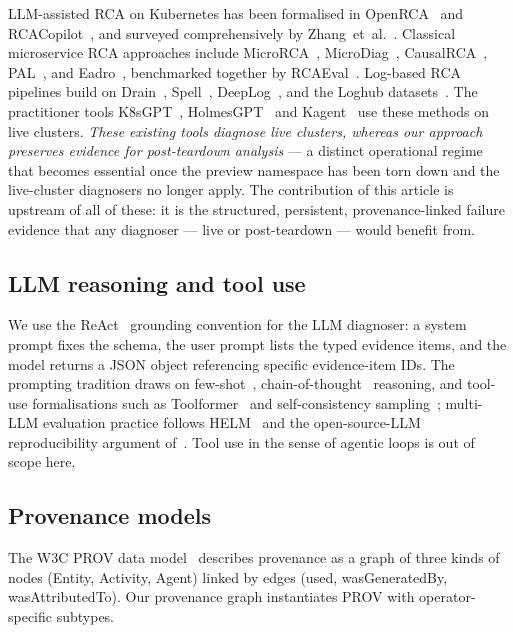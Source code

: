 \documentclass[sigconf, nonacm=true, anonymous=false, review=false]{acmart}
\begin{document}
LLM-assisted RCA on Kubernetes has been formalised in
OpenRCA~\cite{openrca_2025} and RCACopilot~\cite{rcacopilot_2024},
and surveyed comprehensively by
Zhang~et~al.~\cite{zhang_microservice_diagnosis_survey_2025}. Classical
microservice RCA approaches include
MicroRCA~\cite{microrca_2020}, MicroDiag~\cite{microdiag_2021},
CausalRCA~\cite{causalrca_2023}, PAL~\cite{pal_2011}, and
Eadro~\cite{eadro_2023}, benchmarked together by
RCAEval~\cite{rcaeval_2024}. Log-based RCA pipelines build on
Drain~\cite{drain_2017}, Spell~\cite{spell_2016},
DeepLog~\cite{deeplog_2017}, and the Loghub
datasets~\cite{loghub_2023}. The practitioner tools
K8sGPT~\cite{k8sgpt_cncf}, HolmesGPT~\cite{holmesgpt_robusta} and
Kagent~\cite{kagent} use these methods on live clusters.
\emph{These existing tools diagnose live clusters, whereas our
approach preserves evidence for post-teardown analysis} --- a
distinct operational regime that becomes essential once the
preview namespace has been torn down and the live-cluster
diagnosers no longer apply. The contribution of this article is
upstream of all of these: it is the structured, persistent,
provenance-linked failure evidence that any diagnoser --- live or
post-teardown --- would benefit from.

\subsection{LLM reasoning and tool use}
\label{sec:bg-llm}

We use the ReAct~\cite{yao2023react} grounding convention for the LLM
diagnoser: a system prompt fixes the schema, the user prompt lists the
typed evidence items, and the model returns a JSON object referencing
specific evidence-item IDs. The prompting tradition draws on
few-shot~\cite{brown_gpt3_2020}, chain-of-thought~\cite{wei2022cot}
reasoning, and tool-use formalisations such as
Toolformer~\cite{schick_toolformer_2023} and self-consistency
sampling~\cite{wang_selfconsistency_2023}; multi-LLM evaluation
practice follows HELM~\cite{liang_helm_2023} and the
open-source-LLM reproducibility argument
of~\cite{llm_open_advantage}. Tool use in the sense of agentic
loops is out of scope here.

\subsection{Provenance models}
\label{sec:bg-prov}

The W3C PROV data model~\cite{lebo_provo_2013, w3c_prov_dm} describes
provenance as a graph of three kinds of nodes (Entity, Activity, Agent)
linked by edges (used, wasGeneratedBy, wasAttributedTo). Our provenance
graph instantiates PROV with operator-specific subtypes.
\end{document}
